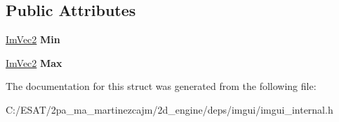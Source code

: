 \subsection*{Public Attributes}
\begin{DoxyCompactItemize}
\item 
\mbox{\label{struct_im_rect_af8f3fbf7ec983e03548b88e14ba68aa8}} 
\hyperlink{struct_im_vec2}{Im\+Vec2} {\bfseries Min}
\item 
\mbox{\label{struct_im_rect_aad58c13340d320b350a72a037e3f7628}} 
\hyperlink{struct_im_vec2}{Im\+Vec2} {\bfseries Max}
\end{DoxyCompactItemize}


The documentation for this struct was generated from the following file\+:\begin{DoxyCompactItemize}
\item 
C\+:/\+E\+S\+A\+T/2pa\+\_\+ma\+\_\+martinezcajm/2d\+\_\+engine/deps/imgui/imgui\+\_\+internal.\+h\end{DoxyCompactItemize}
